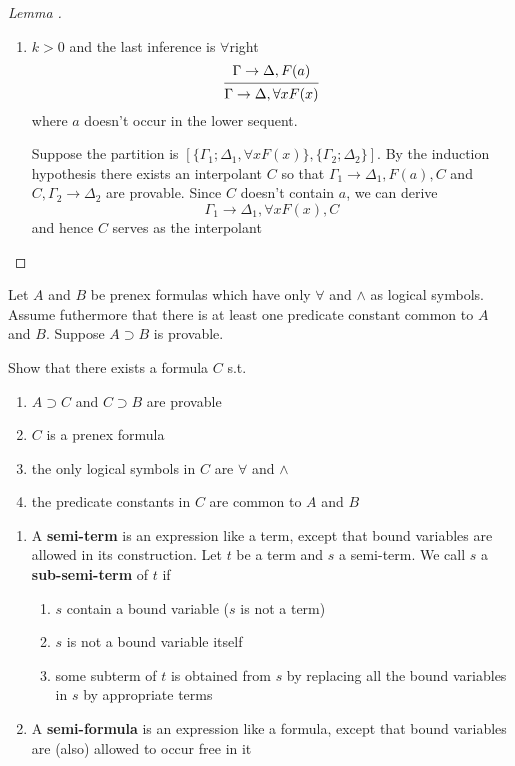 \documentclass[11pt]{article}
\begin{document}
\begin{proof}[Lemma \cite{lemma6.5}]
\begin{enumerate}
\item \(k>0\) and the last inference is \(\forall\)right
\begin{equation*}
\begin{prooftree}%
\hypo{\Gamma\to\Delta,F(a)}
\infer1{\Gamma\to\Delta,\forall xF(x)}
\end{prooftree}
\end{equation*}
where \(a\) doesn't occur in the lower sequent.

Suppose the partition is \([\{\Gamma_1;\Delta_1,\forall xF(x)\},\{\Gamma_2;\Delta_2\}]\). By the
induction hypothesis there exists an interpolant \(C\) so that \(\Gamma_1\to\Delta_1,F(a),C\)
and \(C,\Gamma_2\to\Delta_2\) are provable. Since \(C\) doesn't contain \(a\), we can derive
\begin{equation*}
\Gamma_1\to\Delta_1,\forall xF(x),C
\end{equation*}
and hence \(C\) serves as the interpolant
\end{enumerate}
\end{proof}

\begin{exercise}
\label{ex6.7}
Let \(A\) and  \(B\) be prenex formulas which have only \(\forall\) and \(\wedge\) as logical
symbols. Assume futhermore that there is at least one predicate constant common to \(A\)
and \(B\). Suppose \(A\supset B\) is provable.

Show that there exists a formula \(C\) s.t.
\begin{enumerate}
\item \(A\supset C\) and \(C\supset B\) are provable
\item \(C\) is a prenex formula
\item the only logical symbols in \(C\) are \(\forall\) and \(\wedge\)
\item the predicate constants in \(C\) are common to \(A\) and \(B\)
\end{enumerate}
\end{exercise}

\begin{definition}[]
\begin{enumerate}
\item A \textbf{semi-term} is an expression like a term, except that bound variables are allowed in its
construction. Let \(t\) be a term and \(s\) a semi-term. We call \(s\) a \textbf{sub-semi-term}
of \(t\) if
\begin{enumerate}
\item \(s\) contain a bound variable (\(s\) is not a term)
\item \(s\) is not a bound variable itself
\item some subterm of \(t\) is obtained from \(s\) by replacing all the bound variables in \(s\)
by appropriate terms
\end{enumerate}
\item A \textbf{semi-formula} is an expression like a formula, except that bound variables are (also) allowed
to occur free in it
\end{enumerate}
\end{definition}
\end{document}
